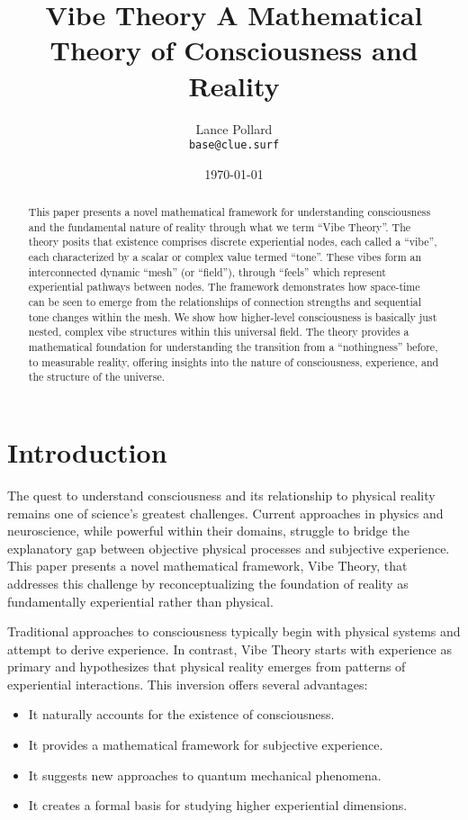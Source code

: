 \documentclass{article}
\title{
  {\huge \textbf{Vibe Theory}} %
  \large A Mathematical Theory of Consciousness and Reality
}
\author{Lance Pollard \\ \texttt{base@clue.surf}}
\date{\today}
\date{}
\theoremstyle{definition}
\theoremstyle{axiom}
\theoremstyle{theorem}
\theoremstyle{proposition}
\begin{document}
\maketitle

\begin{abstract}
This paper presents a novel mathematical framework for understanding consciousness and the fundamental nature of reality through what we term \enquote{Vibe Theory}. The theory posits that existence comprises discrete experiential nodes, each called a \enquote{vibe}, each characterized by a scalar or complex value termed \enquote{tone}. These vibes form an interconnected dynamic \enquote{mesh} (or \enquote{field}), through \enquote{feels} which represent experiential pathways between nodes. The framework demonstrates how space-time can be seen to emerge from the relationships of connection strengths and sequential tone changes within the mesh. We show how higher-level consciousness is basically just nested, complex vibe structures within this universal field. The theory provides a mathematical foundation for understanding the transition from a \enquote{nothingness} before, to measurable reality, offering insights into the nature of consciousness, experience, and the structure of the universe.
\end{abstract}
\section{Introduction}

The quest to understand consciousness and its relationship to physical reality remains one of science's greatest challenges. Current approaches in physics and neuroscience, while powerful within their domains, struggle to bridge the explanatory gap between objective physical processes and subjective experience. This paper presents a novel mathematical framework, Vibe Theory, that addresses this challenge by reconceptualizing the foundation of reality as fundamentally experiential rather than physical.

Traditional approaches to consciousness typically begin with physical systems and attempt to derive experience. In contrast, Vibe Theory starts with experience as primary and hypothesizes that physical reality emerges from patterns of experiential interactions. This inversion offers several advantages:

\begin{itemize}
\item It naturally accounts for the existence of consciousness.
\item It provides a mathematical framework for subjective experience.
\item It suggests new approaches to quantum mechanical phenomena.
\item It creates a formal basis for studying higher experiential dimensions.
\end{itemize}
\end{document}
